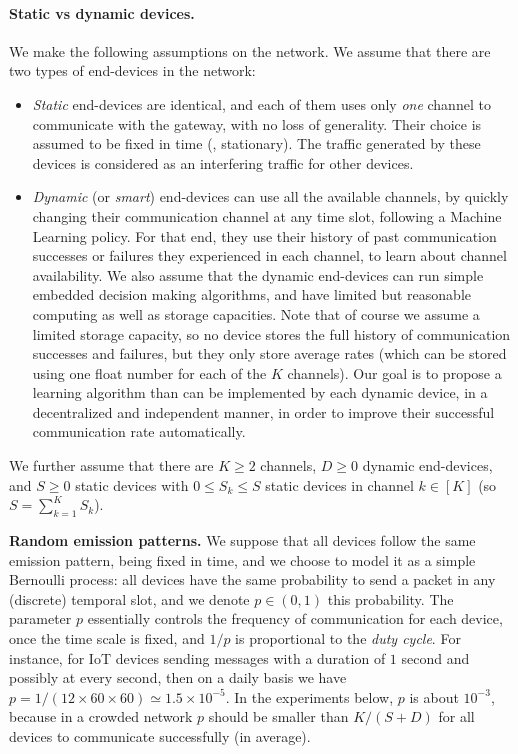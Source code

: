 \paragraph{Static vs dynamic devices.}
%
We make the following assumptions on the network.
We assume that there are two types of end-devices in the network:
\begin{itemize}
    \item
    \emph{Static} end-devices are identical, and each of them uses only \emph{one} channel to communicate with the gateway, with no loss of generality.
    Their choice is assumed to be fixed in time (\ie, stationary). The traffic generated by these devices is considered as an interfering traffic for other devices.
    \item
    \emph{Dynamic} (or \emph{smart}) end-devices can use all the available channels, by quickly changing their communication channel at any time slot, following a Machine Learning policy.
    For that end, they use their history of past communication successes or failures they experienced in each channel, to learn about channel availability.
    We also assume that the dynamic end-devices can run simple embedded decision making algorithms, and have limited but reasonable computing as well as storage capacities.
    Note that of course we assume a limited storage capacity, so no device stores the full history of communication successes and failures, but they only store average rates (which can be stored using one float number for each of the $K$ channels).
    Our goal is to propose a learning algorithm than can be implemented by each dynamic device, in a decentralized and independent manner, in order to improve their successful communication rate automatically.
\end{itemize}

We further assume that there are $K \geq 2$ channels, $D \geq 0$ dynamic end-devices, and $S \geq 0$ static devices
with $0 \leq S_k \leq S$ static devices in channel $k \in [K]$ (so $S = \sum_{k=1}^{K} S_k$).


\textbf{Random emission patterns.}
%
We suppose that all devices follow the same emission pattern, being fixed in time, and we choose to model it as a simple Bernoulli process:
all devices have the same probability to send a packet in any (discrete) temporal slot, and we denote $p \in (0, 1)$ this probability.
The parameter $p$ essentially controls the frequency of communication for each device, once the time scale is fixed, and $1/p$ is proportional to the \emph{duty cycle}.
For instance, for IoT devices sending messages with a duration of $1$ second and possibly at every second, then on a daily basis we have $p = 1 / (12 \times 60 \times 60) \simeq 1.5 \times 10^{-5}$.
In the experiments below, $p$ is about $10^{-3}$, because in a crowded network $p$ should be smaller than $K / (S + D)$ for all devices to communicate successfully (in average).


